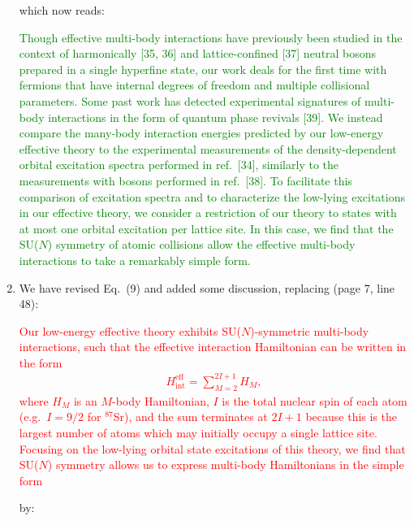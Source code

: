 \documentclass[preprint,showkeys,nofootinbib]{revtex4-1}
\renewcommand{\t}{\text} %
\newcommand{\1}{\mathds{1}}
\newcommand{\red}[1]{\textcolor{red}{#1}}
\newcommand{\green}[1]{\textcolor{green}{#1}}
\newcounter{point}
\begin{document}
\begin{enumerate}[label=(R1.\arabic{point}.\arabic*)]
  which now reads:

  \green{Though effective multi-body interactions have previously been
    studied in the context of harmonically [35, 36] and
    lattice-confined [37] neutral bosons prepared in a single
    hyperfine state, our work deals for the first time with fermions
    that have internal degrees of freedom and multiple collisional
    parameters.  Some past work has detected experimental signatures
    of multi-body interactions in the form of quantum phase revivals
    [39].  We instead compare the many-body interaction energies
    predicted by our low-energy effective theory to the experimental
    measurements of the density-dependent orbital excitation spectra
    performed in ref.~[34], similarly to the measurements with bosons
    performed in ref.~[38].  To facilitate this comparison of
    excitation spectra and to characterize the low-lying excitations
    in our effective theory, we consider a restriction of our theory
    to states with at most one orbital excitation per lattice site.
    In this case, we find that the SU($N$) symmetry of atomic
    collisions allow the effective multi-body interactions to take a
    remarkably simple form.}


\item We have revised Eq.~(9) and added some discussion, replacing
  (page 7, line 48):

  \red{Our low-energy effective theory exhibits SU($N$)-symmetric
    multi-body interactions, such that the effective interaction
    Hamiltonian can be written in the form
    \begin{align*}
      H_{\t{int}}^{\t{eff}} = \sum_{M=2}^{2I+1} H_M, \tag{9}
    \end{align*}
    where $H_M$ is an $M$-body Hamiltonian, $I$ is the total nuclear
    spin of each atom (e.g.~$I=9/2$ for ${}^{87}$Sr), and the sum
    terminates at $2I+1$ because this is the largest number of atoms
    which may initially occupy a single lattice site.  Focusing on the
    low-lying orbital state excitations of this theory, we find that
    SU($N$) symmetry allows us to express multi-body Hamiltonians in
    the simple form}

  by:


\end{enumerate}
\end{document}
